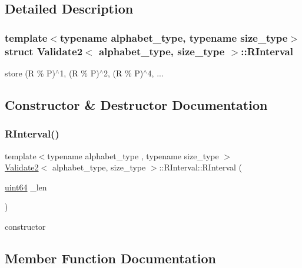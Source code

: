 \subsection{Detailed Description}
\subsubsection*{template$<$typename alphabet\+\_\+type, typename size\+\_\+type$>$\newline
struct Validate2$<$ alphabet\+\_\+type, size\+\_\+type $>$\+::\+R\+Interval}

store (R \% P)$^\wedge$1, (R \% P)$^\wedge$2, (R \% P)$^\wedge$4, ... 

\subsection{Constructor \& Destructor Documentation}
\mbox{\label{struct_validate2_1_1_r_interval_af2e88047192f7e9703b9faa2298cb5fc}} 
\subsubsection{\texorpdfstring{R\+Interval()}{RInterval()}}
{\footnotesize\ttfamily template$<$typename alphabet\+\_\+type , typename size\+\_\+type $>$ \\
\hyperlink{class_validate2}{Validate2}$<$ alphabet\+\_\+type, size\+\_\+type $>$\+::R\+Interval\+::\+R\+Interval (\begin{DoxyParamCaption}\item[{\hyperlink{types_8h_a60e8696a4678cd348e991a1f172e53f7}{uint64}}]{\+\_\+len }\end{DoxyParamCaption})\hspace{0.3cm}{\ttfamily [inline]}}



constructor 



\subsection{Member Function Documentation}
\mbox{\label{struct_validate2_1_1_r_interval_a84006809e4b3ef58bd7335d2f46a92b1}} 
